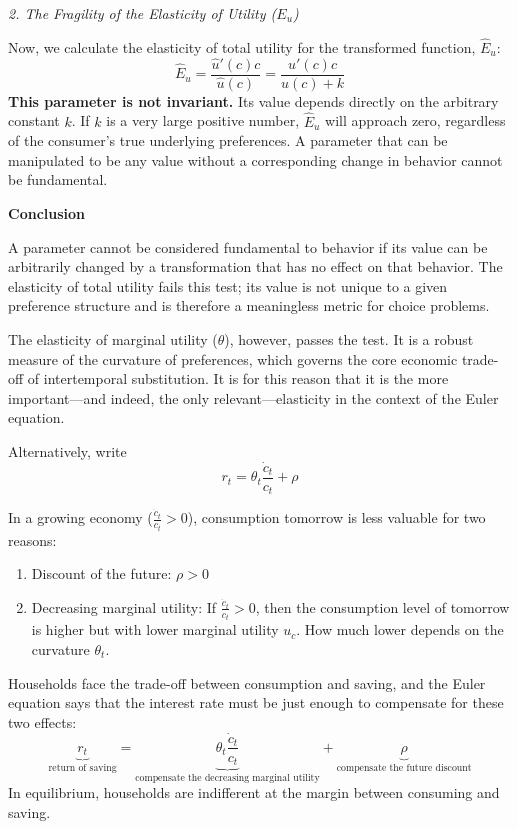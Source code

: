 \begin{remark*}
    \noindent\textit{2. The Fragility of the Elasticity of Utility ($E_u$)}

    Now, we calculate the elasticity of total utility for the transformed function, $\hat{E}_u$:
    $$ \hat{E}_u = \frac{\hat{u}'(c) c}{\hat{u}(c)} = \frac{u'(c) c}{u(c) + k} $$
    \textbf{This parameter is not invariant.} Its value depends directly on the arbitrary constant $k$. If $k$ is a very large positive number, $\hat{E}_u$ will approach zero, regardless of the consumer's true underlying preferences. A parameter that can be manipulated to be any value without a corresponding change in behavior cannot be fundamental.

    \noindent\textbf{Conclusion}

    A parameter cannot be considered fundamental to behavior if its value can be arbitrarily changed by a transformation that has no effect on that behavior. The elasticity of total utility fails this test; its value is not unique to a given preference structure and is therefore a meaningless metric for choice problems.

    The elasticity of marginal utility ($\theta$), however, passes the test. It is a robust measure of the curvature of preferences, which governs the core economic trade-off of intertemporal substitution. It is for this reason that it is the more important—and indeed, the only relevant—elasticity in the context of the Euler equation.

\end{remark*}


Alternatively, write \[
    r_t = \theta_t \frac{\dot{c}_t}{c_t} + \rho
\]

In a growing economy ($\frac{\dot{c}_t}{c_t} > 0$), consumption tomorrow is less valuable for two reasons: \begin{enumerate}
    \item Discount of the future: $\rho > 0$
    \item Decreasing marginal utility: If $\frac{\dot{c}_t}{c_t} >0$, then the consumption level of tomorrow is higher but with lower marginal utility $u_c$. How much lower depends on the curvature $\theta_t$.
\end{enumerate}

Households face the trade-off between consumption and saving, and the Euler equation says that the interest rate must be just enough to compensate for these two effects: \[
    \underbrace{r_t}_{\text{return of saving}} = \underbrace{\theta_t \frac{\dot{c}_t}{c_t}}_{\text{compensate the decreasing marginal utility}} + \underbrace{\rho}_{\text{compensate the future discount}}
\]
In equilibrium, households are indifferent at the margin between consuming and saving.

